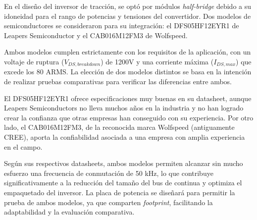 En el diseño del inversor de tracción, se optó por módulos \textit{half-bridge} debido a su idoneidad para el rango de potencias y tensiones del convertidor. Dos modelos de semiconductores se consideraron para su integración: el DFS05HF12EYR1 de Leapers Semiconductor y el CAB016M12FM3 de Wolfspeed.

Ambos modelos cumplen estrictamente con los requisitos de la aplicación, con un voltaje de ruptura (\(V_{DS,breakdown}\)) de 1200V y una corriente máxima (\(I_{DS,max}\)) que excede los 80 ARMS. La elección de dos modelos distintos se basa en la intención de realizar pruebas comparativas para verificar las diferencias entre ambos.

El DFS05HF12EYR1 ofrece especificaciones muy buenas en su datasheet, aunque Leapers Semiconductors no lleva muchos años en la industria y no han logrado crear la confianza que otras empresas han conseguido con su experiencia. Por otro lado, el CAB016M12FM3, de la reconocida marca Wolfspeed (antiguamente CREE), aporta la confiabilidad asociada a una empresa con amplia experiencia en el campo.

Según sus respectivos datasheets, ambos modelos permiten alcanzar sin mucho esfuerzo una frecuencia de conmutación de 50 kHz, lo que contribuye significativamente a la reducción del tamaño del bus de continua y optimiza el empaquetado del inversor. La placa de potencia se diseñará para permitir la prueba de ambos modelos, ya que comparten \textit{footprint}, facilitando la adaptabilidad y la evaluación comparativa.

